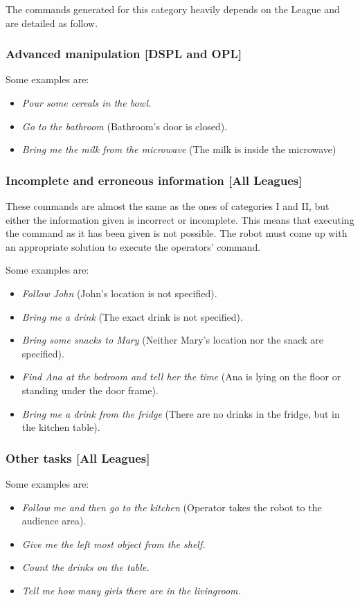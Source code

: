 The commands generated for this category heavily depends on the League and are detailed as follow.

\subsubsection{Advanced manipulation [DSPL and OPL]}
Some examples are:
\begin{itemize}
	\item \textit{Pour some cereals in the bowl.}
	\item \textit{Go to the bathroom} (Bathroom's door is closed).
	\item \textit{Bring me the milk from the microwave} (The milk is inside the microwave)
\end{itemize}

\subsubsection{Incomplete and erroneous information [All Leagues]}
These commands are almost the same as the ones of categories I and II, but either the information given is incorrect or incomplete. This means that executing the command as it has been given is not possible. The robot must come up with an appropriate solution to execute the operators' command.

Some examples are:
\begin{itemize}
	\item \textit{Follow John} (John's location is not specified).
	\item \textit{Bring me a drink} (The exact drink is not specified).
	\item \textit{Bring some snacks to Mary} (Neither Mary's location nor the snack are specified).
	\item \textit{Find Ana at the bedroom and tell her the time} (Ana is lying on the floor or standing under the door frame).
	\item \textit{Bring me a drink from the fridge} (There are no drinks in the fridge, but in the kitchen table).
\end{itemize}

\subsubsection{Other tasks [All Leagues]}
Some examples are:
\begin{itemize}
	\item \textit{Follow me and then go to the kitchen} (Operator takes the robot to the audience area).
	\item \textit{Give me the left most object from the shelf.}
	\item \textit{Count the drinks on the table.}
	\item \textit{Tell me how many girls there are in the livingroom.}
\end{itemize}


